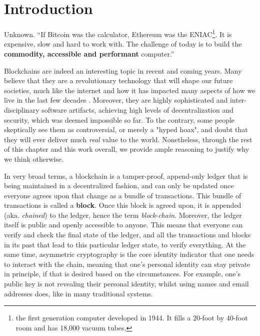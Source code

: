 \chapter{Introduction} \label{chap:intoroduction}

\begin{chapquote}{Unknown.}
``If Bitcoin was the calculator, Ethereum was the ENIAC\footnote{the first generation computer
developed in 1944. It fills a 20-foot by 40-foot room and has 18,000 vacuum tubes.}. It is
expensive, slow and hard to work with. The challenge of today is to build the \textbf{commodity,
accessible and performant} computer.''
\end{chapquote}

Blockchains are indeed an interesting topic in recent and coming years. Many believe that they are a
revolutionary technology that will shape our future societies, much like the internet and how it has
impacted many aspects of how we live in the last few decades \cite{pirrongWillBlockchainBe2019}.
Moreover, they are highly sophisticated and inter-disciplinary software artifacts, achieving high
levels of decentralization and security, which was deemed impossible so far. To the contrary, some
people skeptically see them as controversial, or merely a "hyped hoax", and doubt that they will
ever deliver much \textit{real} value to the world. Nonetheless, through the rest of this chapter
and this work overall, we provide ample reasoning to justify why we think otherwise.

In very broad terms, a blockchain is a tamper-proof, append-only ledger that is being maintained in
a decentralized fashion, and can only be updated once everyone agrees upon that change as a bundle
of transactions. This bundle of transactions is called a \textbf{block}. Once this block is agreed
upon, it is appended (aka. \textit{chained}) to the ledger, hence the term
\textit{block}-\textit{chain}. Moreover, the ledger itself is public and openly accessible to
anyone. This means that everyone can verify and check the final state of the ledger, and all the
transactions and blocks in its past that lead to this particular ledger state, to verify everything.
At the same time, asymmetric cryptography is the core identity indicator that one needs to interact
with the chain, meaning that one's personal identity can stay private in principle, if that is
desired based on the circumstances. For example, one's public key is not revealing their personal
identity, whilst using names and email addresses does, like in many traditional systems.

